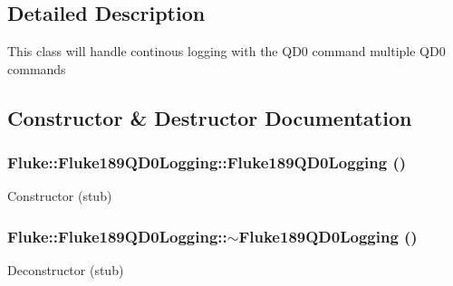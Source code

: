 \subsection{Detailed Description}
This class will handle continous logging with the QD0 command multiple QD0 commands 

\subsection{Constructor \& Destructor Documentation}
\hypertarget{classFluke_1_1Fluke189QD0Logging_ab856daf79c71ace0841c10c9f9b8f9e6}{
\subsubsection[{Fluke189QD0Logging}]{\setlength{\rightskip}{0pt plus 5cm}Fluke::Fluke189QD0Logging::Fluke189QD0Logging ()}}
\label{classFluke_1_1Fluke189QD0Logging_ab856daf79c71ace0841c10c9f9b8f9e6}
Constructor (stub) \hypertarget{classFluke_1_1Fluke189QD0Logging_ac134feed3bec91193ba7ffd119f9833d}{
\subsubsection[{$\sim$Fluke189QD0Logging}]{\setlength{\rightskip}{0pt plus 5cm}Fluke::Fluke189QD0Logging::$\sim$Fluke189QD0Logging ()}}
\label{classFluke_1_1Fluke189QD0Logging_ac134feed3bec91193ba7ffd119f9833d}
Deconstructor (stub) 

